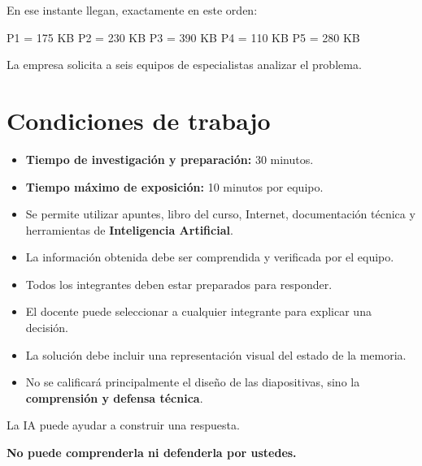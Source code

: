 \documentclass[
  spanish,
  letterpaper,
]{scrbook}
\newenvironment{Shaded}{\begin{snugshade}}{\end{snugshade}}
\newcommand{\NormalTok}[1]{\textcolor[rgb]{0.00,0.23,0.31}{#1}}
\providecommand{\tightlist}{%
  \setlength{\itemsep}{0pt}\setlength{\parskip}{0pt}}
\begin{document}
En ese instante llegan, exactamente en este orden:

\begin{Shaded}
\begin{Highlighting}[]
\NormalTok{P1 = 175 KB}
\NormalTok{P2 = 230 KB}
\NormalTok{P3 = 390 KB}
\NormalTok{P4 = 110 KB}
\NormalTok{P5 = 280 KB}
\end{Highlighting}
\end{Shaded}

La empresa solicita a seis equipos de especialistas analizar el
problema.


\chapter{Condiciones de trabajo}\label{condiciones-de-trabajo}

\begin{itemize}
\tightlist
\item
  \textbf{Tiempo de investigación y preparación:} 30 minutos.
\item
  \textbf{Tiempo máximo de exposición:} 10 minutos por equipo.
\item
  Se permite utilizar apuntes, libro del curso, Internet, documentación
  técnica y herramientas de \textbf{Inteligencia Artificial}.
\item
  La información obtenida debe ser comprendida y verificada por el
  equipo.
\item
  Todos los integrantes deben estar preparados para responder.
\item
  El docente puede seleccionar a cualquier integrante para explicar una
  decisión.
\item
  La solución debe incluir una representación visual del estado de la
  memoria.
\item
  No se calificará principalmente el diseño de las diapositivas, sino la
  \textbf{comprensión y defensa técnica}.
\end{itemize}

\begin{tcolorbox}[enhanced jigsaw, arc=.35mm, bottomrule=.15mm, bottomtitle=1mm, breakable, colback=white, colbacktitle=quarto-callout-tip-color!10!white, colframe=quarto-callout-tip-color-frame, coltitle=black, left=2mm, leftrule=.75mm, opacityback=0, opacitybacktitle=0.6, rightrule=.15mm, title=\textcolor{quarto-callout-tip-color}{\faLightbulb}\hspace{0.5em}{IA permitida}, titlerule=0mm, toprule=.15mm, toptitle=1mm]

La IA puede ayudar a construir una respuesta.

\textbf{No puede comprenderla ni defenderla por ustedes.}

\end{tcolorbox}
\end{document}
